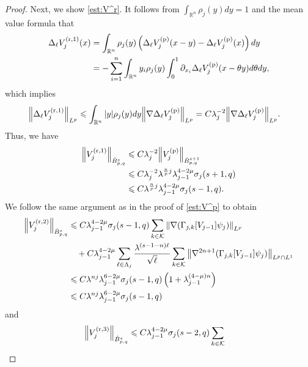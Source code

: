 \documentclass[a4paper,12pt,reqno]{amsart}
\theoremstyle{plain}
\theoremstyle{definition}
\newcommand{\dB}{\dot{B}}
\renewcommand{\leq}{\leqslant}
\newcommand{\n}[1]{{\left\|#1\right\|}}
\newcommand{\R}{\mathbb{R}}
\renewcommand{\sp}[1]{\left(#1\right)}
\begin{document}
\begin{proof}
Next, we show \eqref{est:V^r}.
It follows from $\int_{\R^n} \rho_{j}(y) dy = 1$ and the mean value formula that 
\begin{align}
    \Delta_{\ell}V^{({\rm r},1)}_{j}(x)
    &
    =
    \int_{\R^n}
    \rho_{j}(y)\sp{\Delta_{\ell}V^{({\rm p})}_{j}(x-y)-\Delta_{\ell}V^{({\rm p})}_j(x)}dy
    \\
    &
    =
    -
    \sum_{i=1}^n
    \int_{\R^n}
    y_i\rho_{j}(y)\int_0^1\partial_{x_i}\Delta_{\ell}V^{({\rm p})}_j(x-\theta y)d\theta dy,
\end{align}
which implies 
\begin{align}
    \n{\Delta_{\ell}V^{({\rm r},1)}_j}_{L^p}
    &
    \leq 
    \int_{\R^n}|y|\rho_{j}(y)dy
    \n{\nabla\Delta_{\ell}V^{({\rm p})}_j}_{L^p}
    = 
    C\lambda_j^{-2}
    \n{\nabla\Delta_{\ell}V^{({\rm p})}_j}_{L^p}.
\end{align}
Thus, we have 
\begin{align}
    \n{V^{({\rm r},1)}_j}_{\dB_{p,q}^s}
    &
    \leq 
    C
    \lambda_j^{-2}
    \n{V^{({\rm p})}_j}_{\dB_{p,q}^{s+1}}
    \\
    &\leq 
    C\lambda_j^{-2}
    \lambda^{\frac{n}{p}j}
    \lambda_{j-1}^{4-2\mu}\sigma_j(s+1,q)
    \\
    &\leq 
    C
    \lambda^{\frac{n}{p}j}
    \lambda_{j-1}^{4-2\mu}\sigma_j(s-1,q).\label{est:Vr1}
\end{align}
We follow the same argument as in the proof of \eqref{est:V^p} to obtain  
\begin{align}
    \n{V^{({\rm r},2)}_j}_{\dB_{p,q}^{s}}
    &
    \leq 
    C
    \lambda_{j-1}^{4-2\mu}
    \sigma_j(s-1,q)
    \sum_{k \in \mathcal{K}}
    \n{\nabla(\Gamma_{j,k}[V_{j-1}]\psi_{j})}_{L^{p}}
    \\
    &\quad
    +
    C
    \lambda_{j-1}^{4-2\mu}
    \sum_{\ell\in \Lambda_j}
    \frac{\lambda^{(s-1-n)\ell}}{\sqrt{\ell}}
    \sum_{k \in \mathcal{K}}
    \n{\nabla^{2n+1}(\Gamma_{j,k}[V_{j-1}]\psi_{j})}_{L^{p} \cap L^1}
    \\
    &
    \leq 
    C
    \lambda^{nj}
    \lambda_{j-1}^{6-2\mu}
    \sigma_j(s-1,q)
    \sp{
    1+\lambda_{j-1}^{(4-\mu)n}
    }
    \\
    &
    \leq 
    C\lambda^{nj}
    \lambda_{j-1}^{6-2\mu}
    \sigma_j(s-1,q)\label{est:Vr2}
\end{align}
and
\begin{align}
    \n{V^{({\rm r},3)}_j}_{\dB_{p,q}^{s}}
    &
    \leq 
    C
    \lambda_{j-1}^{4-2\mu}
    \sigma_j(s-2,q)
    \sum_{k \in \mathcal{K}}

\end{align}
\end{proof}
\end{document}
